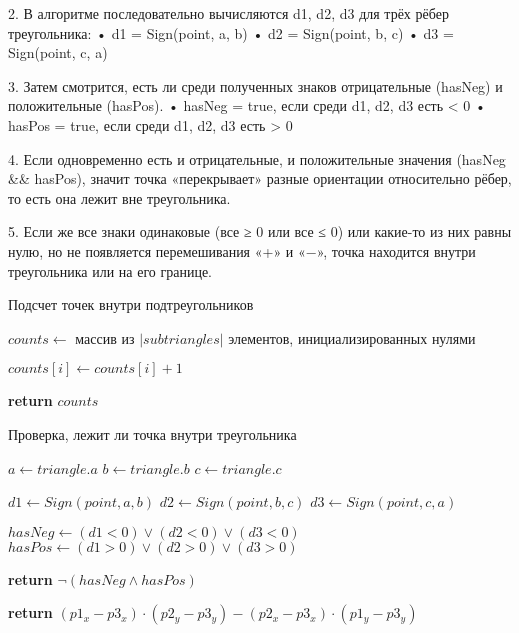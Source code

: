 \documentclass[a4paper,12pt]{article}
\begin{document}
2. В алгоритме последовательно вычисляются d1, d2, d3 для трёх рёбер треугольника:
   • d1 = Sign(point, a, b)  
   • d2 = Sign(point, b, c)  
   • d3 = Sign(point, c, a)

3. Затем смотрится, есть ли среди полученных знаков отрицательные (hasNeg) и положительные (hasPos).  
   • hasNeg = true, если среди d1, d2, d3 есть < 0  
   • hasPos = true, если среди d1, d2, d3 есть > 0

4. Если одновременно есть и отрицательные, и положительные значения (hasNeg && hasPos), значит точка «перекрывает» разные ориентации относительно рёбер, то есть она лежит вне треугольника.

5. Если же все знаки одинаковые (все ≥ 0 или все ≤ 0) или какие-то из них равны нулю, но не появляется перемешивания «+» и «−», точка находится внутри треугольника или на его границе.

\begin{algorithm}
\caption{Подсчет точек внутри подтреугольников}
\begin{algorithmic}[1]
    \State $counts \gets$ массив из $|subtriangles|$ элементов, инициализированных нулями
    
                \State $counts[i] \gets counts[i] + 1$
            \EndIf
        \EndFor
    \EndFor
    
    \State \textbf{return} $counts$
\EndProcedure
\end{algorithmic}
\end{algorithm}

\begin{algorithm}
\caption{Проверка, лежит ли точка внутри треугольника}
\begin{algorithmic}[1]
    \State $a \gets triangle.a$
    \State $b \gets triangle.b$
    \State $c \gets triangle.c$
    
    \State $d1 \gets Sign(point, a, b)$
    \State $d2 \gets Sign(point, b, c)$
    \State $d3 \gets Sign(point, c, a)$
    
    \State $hasNeg \gets (d1 < 0) \lor (d2 < 0) \lor (d3 < 0)$
    \State $hasPos \gets (d1 > 0) \lor (d2 > 0) \lor (d3 > 0)$
    
    \State \textbf{return} $\lnot(hasNeg \land hasPos)$
\EndProcedure

    \State \textbf{return} $(p1_x - p3_x) \cdot (p2_y - p3_y) - (p2_x - p3_x) \cdot (p1_y - p3_y)$
\EndProcedure
\end{algorithmic}
\end{algorithm}
\end{document}
